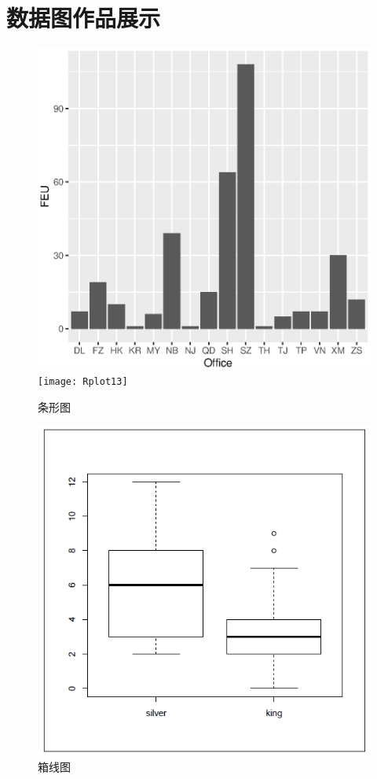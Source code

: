 \documentclass[a4paper]{book}
\begin{document}
	\section{数据图作品展示}
		\begin{figure}
		\begin{center}
		\includegraphics[scale=0.4]{Rplot01}
		\qquad
		\texttt{[image: Rplot13]}
		\caption{条形图}
		\end{center}
		\end{figure}
		\begin{figure}
		\begin{center}
		\includegraphics[scale=0.3]{boplot.PNG}
		\caption{箱线图}
		\end{center}
		\end{figure}
\end{document}

